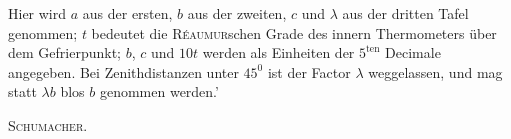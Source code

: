 Hier wird $a$ aus der ersten, $b$ aus der zweiten, $c$ und $\lambda$ aus der dritten Tafel genommen; $t$ bedeutet die \textsc{Réaumur}schen Grade des innern Thermometers über dem Gefrierpunkt; $b$, $c$ und $10t$ werden als Einheiten der $5^{\mathrm{ten}}$ Decimale angegeben. Bei Zenithdistanzen unter $45^0$ ist der Factor $\lambda$ weggelassen, und mag statt $\lambda b$ blos $b$ genommen werden.'
\begin{flushright}\textsc{Schumacher.}\end{flushright}
\clearpage
\begingroup
\pagestyle{empty}
\newsavebox{\GaussVIRefractionBox}
\newenvironment{GaussVIRefractionPlate}[1]{%
  \par\noindent
  \begin{lrbox}{\GaussVIRefractionBox}%
  \begin{minipage}[t][.87\textheight][t]{\dimexpr\linewidth-20pt\relax}%
  \centering
  \vspace*{8pt}%
  {\footnotesize\bfseries REFRACTIONSTAFELN.\par}%
  \smallskip\nointerlineskip
  \hbox to \linewidth{\hfil\rule{.92\linewidth}{.35pt}\hfil}%
  \smallskip
  {\normalsize #1\par}%
  \smallskip
}{%
  \par
  \end{minipage}%
  \end{lrbox}%
  {\setlength{\fboxrule}{1.8pt}\setlength{\fboxsep}{1.2pt}%
  \makebox[\linewidth][c]{\fbox{%
    \setlength{\fboxrule}{.4pt}\setlength{\fboxsep}{6pt}%
    \fbox{\usebox{\GaussVIRefractionBox}}}}}%
  \par
}
\thispagestyle{empty}
\noindent{}%
%
\makebox[\dimexpr\linewidth-24mm\relax]{}%
\makebox[12mm][r]{}\par\nobreak\smallskip
